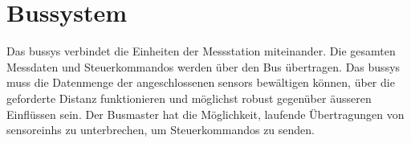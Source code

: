 \section{Bussystem}
Das \gls{bussys} verbindet die Einheiten der Messstation miteinander. Die gesamten Messdaten und Steuerkommandos werden über den Bus übertragen. Das \gls{bussys} muss die Datenmenge der angeschlossenen \glspl{sensor} bewältigen können, über die geforderte Distanz funktionieren und möglichst robust gegenüber äusseren Einflüssen sein. Der Busmaster hat die Möglichkeit, laufende Übertragungen von \glspl{sensoreinh} zu unterbrechen, um Steuerkommandos zu senden.
